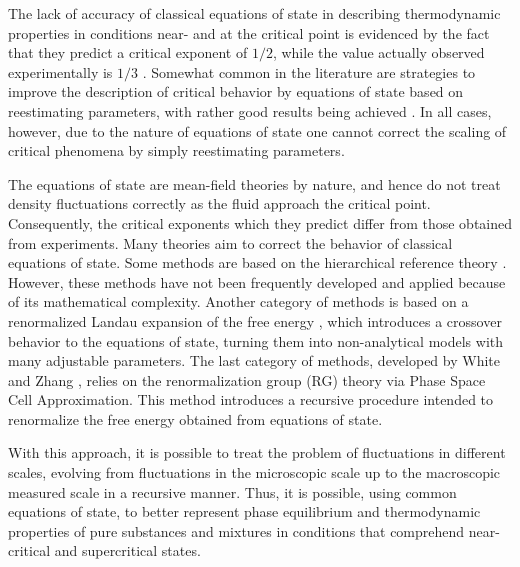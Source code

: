 \documentclass[preprint,12pt,3p]{elsarticle}
\begin{document}
	The lack of accuracy of classical equations of state in describing thermodynamic properties in conditions near- and at the critical point is evidenced by the fact that they predict a critical exponent of $1/2$, while the value actually observed experimentally is $1/3$ \cite{sengers1974van,wyczalkowska2004critical,stanley1999scaling}. Somewhat common in the literature are strategies to improve the description of critical behavior by equations of state based on reestimating parameters, with rather good results being achieved \cite{palma2017re,vinhal2017evaluation}. In all cases, however, due to the nature of equations of state one cannot correct the scaling of critical phenomena by simply reestimating parameters.
    
    The equations of state are mean-field theories by nature, and hence do not treat density fluctuations correctly as the fluid approach the critical point. Consequently, the critical exponents which they predict differ from those obtained from experiments. Many theories aim to correct the behavior of classical equations of state. Some methods are based on the hierarchical reference theory \cite{parola1984liquid,parola1985hierarchical,meroni1990differential,meroni1993differential}. However, these methods have not been frequently developed and applied because of its mathematical complexity. Another category of methods is based on a renormalized Landau expansion of the free energy \cite{wyczalkowska2004critical,chen1990crossover,kiselev1991universal,kiselev1998cubic,anisimov1992crossover,kiselev1999cubic,kiselev1999crossover}, which introduces a crossover behavior to the equations of state, turning them into non-analytical models with many adjustable parameters. The last category of methods, developed by White and Zhang \cite{white1993renormalization,white1995renormalization,white1998renormalization}, relies on the renormalization group (RG) theory via Phase Space Cell Approximation. This method introduces a recursive procedure intended to renormalize the free energy obtained from equations of state.
	
	With this approach, it is possible to treat the problem of fluctuations in different scales, evolving from fluctuations in the microscopic scale up to the macroscopic measured scale in a recursive manner. Thus, it is possible, using common equations of state, to better represent phase equilibrium and thermodynamic properties of pure substances and mixtures in conditions that comprehend near-critical and supercritical states.
	
\end{document}
